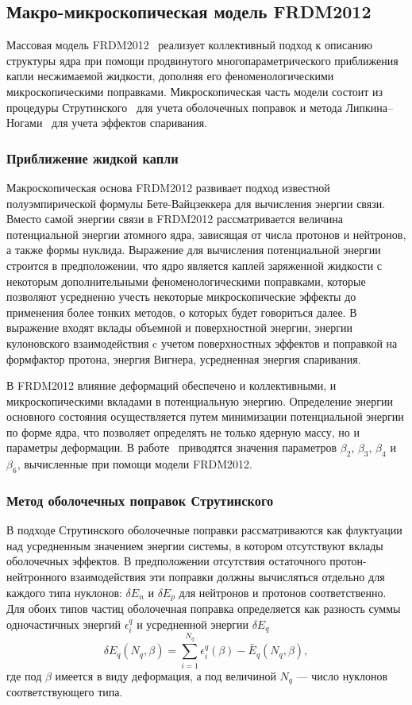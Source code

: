 \subsection{Макро-микроскопическая модель FRDM2012}
Массовая модель FRDM2012~\cite{moller2016} реализует коллективный подход к описанию структуры ядра при помощи продвинутого многопараметрического приближения капли несжимаемой жидкости, дополняя его феноменологическими микроскопическими поправками. Микроскопическая часть модели состоит из процедуры Струтинского~\cite{strutinsky1966,strutinsky1967} для учета оболочечных поправок и метода Липкина--Ногами~\cite{lipkin1960,nogami1964} для учета эффектов спаривания.

\subsubsection{Приближение жидкой капли}
Макроскопическая основа FRDM2012 развивает подход известной полуэмпирической формулы Бете-Вайцзеккера для вычисления энергии связи. Вместо самой энергии связи в FRDM2012 рассматривается величина потенциальной энергии атомного ядра, зависящая от числа протонов и нейтронов, а также формы нуклида. Выражение для вычисления потенциальной энергии строится в предположении, что ядро является каплей заряженной жидкости с некоторым дополнительными феноменологическими поправками, которые позволяют усредненно учесть некоторые микроскопические эффекты до применения более тонких методов, о которых будет говориться далее. В выражение входят вклады объемной и поверхностной энергии, энергии кулоновского взаимодействия c учетом поверхностных эффектов и поправкой на формфактор протона, энергия Вигнера, усредненная энергия спаривания. 

В FRDM2012 влияние деформаций обеспечено и коллективными, и микроскопическими вкладами в потенциальную энергию. Определение энергии основного состояния осуществляется путем минимизации потенциальной энергии по форме ядра, что позволяет определять не только ядерную массу, но и параметры деформации. В работе~\cite{moller2016} приводятся значения параметров $\beta_2$, $\beta_3$, $\beta_4$ и $\beta_6$, вычисленные при помощи модели FRDM2012.

\subsubsection{Метод оболочечных поправок Струтинского}
В подходе Струтинского оболочечные поправки рассматриваются как флуктуации над усредненным значением энергии системы, в котором отсутствуют вклады оболочечных эффектов. В предположении отсутствия остаточного протон-нейтронного взаимодействия эти поправки должны вычисляться отдельно для каждого типа нуклонов: $\delta E_n$ и $\delta E_p$ для нейтронов и протонов соответственно. Для обоих типов частиц оболочечная поправка определяется как разность суммы одночастичных энергий $\epsilon^q_i$ и усредненной энергии $\delta{E_q}$
\begin{equation}
\delta E_q(N_q, \beta) = \sum^{N_q}_{i = 1} \epsilon^q_i(\beta) - \tilde{E_q}(N_q, \beta),
\end{equation}
где под $\beta$ имеется в виду деформация, а под величиной $N_q$ --- число нуклонов соответствующего типа. 

